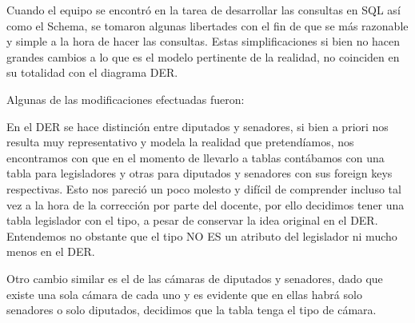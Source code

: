 Cuando el equipo se encontr\'o en la tarea de desarrollar las consultas en SQL as\'i como el Schema, se tomaron algunas libertades con el fin de que se m\'as razonable y simple a la hora de hacer las consultas. Estas simplificaciones si bien no hacen grandes cambios a lo que es el modelo pertinente de la realidad, no coinciden en su totalidad con el diagrama DER. 

Algunas de las modificaciones efectuadas fueron:

En el DER se hace distinci\'on entre diputados y senadores, si bien a priori nos resulta muy representativo y modela la realidad que pretend\'iamos, nos encontramos con que en el momento de llevarlo a tablas cont\'abamos con una tabla para legisladores y otras para diputados y senadores con sus foreign keys respectivas. Esto nos pareci\'o un poco molesto y dif\'icil de comprender incluso tal vez a la hora de la correcci\'on por parte del docente, por ello decidimos tener una tabla legislador con el tipo, a pesar de conservar la idea original en el DER. 
Entendemos no obstante que el tipo NO ES un atributo del legislador ni mucho menos en el DER.

Otro cambio similar es el de las c\'amaras de diputados y senadores, dado que existe una sola c\'amara de cada uno y es evidente que en ellas habr\'a solo senadores o solo diputados, decidimos que la tabla tenga el tipo de c\'amara.